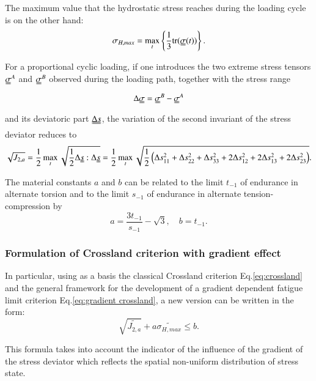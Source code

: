 \documentclass[3p,times,procedia,number]{elsarticle}
\begin{document}
The maximum value that the hydrostatic stress reaches during the loading cycle is on the other hand:
\begin{equation}
\sigma_{H,max}=\max\limits_{t}\left\lbrace \dfrac{1}{3}\textrm{tr}(\uuline{\sigma}(t))\right\rbrace .
\end{equation}

For a proportional cyclic loading, if one introduces the two extreme stress tensors $\uuline{\sigma}^A$ and $\uuline{\sigma}^B$ observed during the loading path, together with the stress range 
\begin{equation}\Delta\uuline{\sigma}=\uuline{\sigma}^B-\uuline{\sigma}^A\end{equation}
and its deviatoric part $\uuline{\Delta s} $, the variation of
the second invariant of the stress deviator reduces to 
\begin{equation}\sqrt{J_{2,a}}=\dfrac{1}{2}\max\limits_{t}\sqrt{\dfrac{1}{2}\Delta\uuline{s}:\Delta\uuline{ s}}=\dfrac{1}{2}\max\limits_{t}\sqrt{\dfrac{1}{2}\left( \Delta s_{11}^2+\Delta s_{22}^2+\Delta s_{33}^2+2\Delta s_{12}^2+2\Delta s_{13}^2+2\Delta s_{23}^2\right) }.\end{equation}


The material constants $a$ and $b$ can be related to  the limit $t_{-1}$ of endurance in alternate torsion and to the limit $s_{-1}$ of endurance in alternate tension-compression by
\begin{equation}
a=\dfrac{3 t_{-1}}{s_{-1}}-\sqrt{3},\quad 
b=t_{-1}.
\label{crossland-ab}
\end{equation}

\subsubsection{Formulation of Crossland criterion with gradient effect}

In particular, using as a basis the classical Crossland criterion Eq.\eqref{eq:crossland} and the general framework for the development of a gradient dependent fatigue limit criterion Eq.\eqref{eq:gradient crossland}, a new version can be written in the form:
\begin{equation}
\sqrt{\widetilde{J_{2,a}}}+a\widetilde{\sigma_{H,max}}\leqslant b .
\end{equation}

This formula takes into account the indicator of the influence of the gradient of the stress deviator which reflects the spatial non-uniform distribution of stress state.
\end{document}
